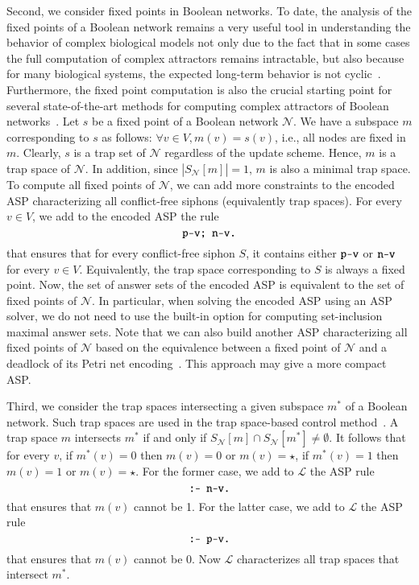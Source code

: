 \documentclass[preprint,12pt]{elsarticle}
\begin{document}
Second, we consider fixed points in Boolean networks.
To date, the analysis of the fixed points of a Boolean network remains
a very useful tool in understanding the behavior of complex biological models not only due to the fact that in some cases the full computation of complex attractors remains intractable, but also because for many biological systems, the expected long-term behavior is not cyclic~\cite{corral2021interplay}.
Furthermore, the fixed point computation is also the crucial starting point for several state-of-the-art methods for computing complex attractors of Boolean networks~\cite{DBLP:conf/bcb/TrinhHB22}.
Let \(s\) be a fixed point of a Boolean network \(\mathcal{N}\).
We have a subspace \(m\) corresponding to \(s\) as follows: \(\forall v \in V, m(v) = s(v)\), i.e., all nodes are fixed in \(m\).
Clearly, \(s\) is a trap set of \(\mathcal{N}\) regardless of the update scheme.
Hence, \(m\) is a trap space of \(\mathcal{N}\).
In addition, since \(\left\vert S_{\mathcal{N}}[m]\right\vert = 1\), \(m\) is also a minimal trap space.
To compute all fixed points of \(\mathcal{N}\), we can add more constraints to the encoded ASP characterizing all conflict-free siphons (equivalently trap spaces).
For every \(v \in V\), we add to the encoded ASP the rule
\[
  \verb|p-v; n-v.|
\]
that ensures that for every conflict-free siphon \(S\), it contains either \(\verb|p-v|\) or \(\verb|n-v|\) for every \(v \in V\).
Equivalently, the trap space corresponding to \(S\) is always a fixed point.
Now, the set of answer sets of the encoded ASP is equivalent to the set of fixed points of \(\mathcal{N}\).
In particular, when solving the encoded ASP using an ASP solver, we do not need to use the built-in option for computing set-inclusion maximal answer sets.
Note that we can also build another ASP characterizing all fixed points of \(\mathcal{N}\) based on the equivalence between a fixed point of \(\mathcal{N}\) and a deadlock of its Petri net encoding~\cite{chatain2014characterization}.
This approach may give a more compact ASP\@.

Third, we consider the trap spaces intersecting a given subspace \(m^{*}\) of a Boolean network.
Such trap spaces are used in the trap space-based control method~\cite{cifuentes2020control}.
A trap space \(m\) intersects \(m^{*}\) if and only if \(S_{\mathcal{N}}[m] \cap S_{\mathcal{N}}[m^{*}] \neq \emptyset\).
It follows that for every \(v\), if \(m^{*}(v) = 0\) then \(m(v) = 0\) or \(m(v) = \star\), if \(m^{*}(v) = 1\) then \(m(v) = 1\) or \(m(v) = \star\).
For the former case, we add to \(\mathcal{L}\) the ASP rule
\[
  \verb|:- n-v.|
\]
that ensures that \(m(v)\) cannot be 1.
For the latter case, we add to \(\mathcal{L}\) the ASP rule
\[
  \verb|:- p-v.|
\]
that ensures that \(m(v)\) cannot be 0.
Now \(\mathcal{L}\) characterizes all trap spaces that intersect \(m^{*}\).
\end{document}
